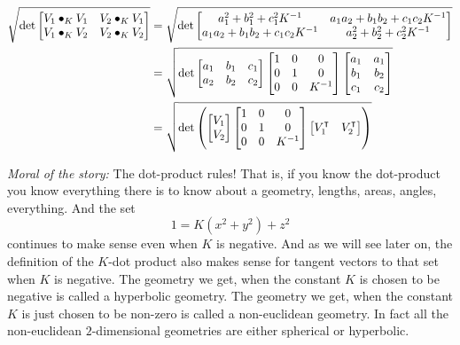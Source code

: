 \documentclass{ximera}
\begin{document}
\begin{problem}
\begin{freeResponse}
\begin{align*}
\sqrt{\det
\begin{bmatrix}
V_{1}\bullet_{K}V_{1} & V_{2}\bullet_{K}V_{1}\\
V_{1}\bullet_{K}V_{2} & V_{2}\bullet_{K}V_{2}%
\end{bmatrix}}
&=\sqrt{\det
\begin{bmatrix}
a^2_1 + b^2_1 + c^2_1K^{-1} & a_1a_2 + b_1b_2 + c_1c_2K^{-1}\\
a_1a_2 + b_1b_2 + c_1c_2K^{-1} & a^2_2 + b^2_2 + c^2_2K^{-1}%
\end{bmatrix}} \\
&= \sqrt{\det
\begin{bmatrix}
a_{1} & b_{1} & c_{1}\\
a_{2} & b_{2} & c_{2}
\end{bmatrix}
\begin{bmatrix}
1 & 0 & 0\\
0 & 1 & 0\\
0 & 0 & K^{-1}
\end{bmatrix}
\begin{bmatrix}
a_{1} & a_{1}  \\
b_{1} & b_{2}  \\
c_{1} &  c_{2}
\end{bmatrix}} \\
&= \sqrt{\det\left( 
\begin{bmatrix}
V_{1} \\
V_{2}
\end{bmatrix}
\begin{bmatrix}
1 & 0 & 0\\
0 & 1 & 0\\
0 & 0 & K^{-1}%
\end{bmatrix}
\begin{bmatrix}
V_{1}^\transpose & V_{2}^\transpose%
\end{bmatrix}
\right) }
\end{align*}
\end{freeResponse}

\end{problem}

\textit{Moral of the story:} The dot-product rules! That is, if you
know the dot-product you know everything there is to know about a
geometry, lengths, areas, angles, everything. And the set
\[
1=K(x^2+y^2)+z^2
\]
continues to make sense even when $K$ is
negative. And as we will see later on, the definition of the $K$-dot
product also makes sense for tangent vectors to that set when $K$ is
negative. The geometry we get, when the constant $K$ is chosen to be
negative is called a hyperbolic geometry. The geometry we get, when
the constant $K$ is just chosen to be non-zero is called a
non-euclidean geometry.  In fact all the non-euclidean $2$-dimensional
geometries are either spherical or hyperbolic.
\end{document}
